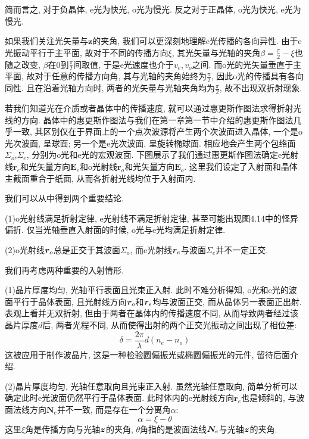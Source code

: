 
简而言之, 对于负晶体, e光为快光, o光为慢光. 反之对于正晶体, o光为快光, e光为慢光.

如果我们关注光矢量与$\bm{z}$的夹角, 我们可以更深刻地理解e光传播的各向异性. 由于e光振动平行于主平面, 故对于不同的传播方向$\xi$, 其光矢量与光轴的夹角$\beta=\frac{\pi}{2}-\xi$也随之改变, $\beta$在$0$到$\frac{\pi}{2}$间取值, 于是e光速度也介于$v_e,v_o$之间. 而o光的光矢量垂直于主平面, 故对于任意的传播方向角, 其与光轴的夹角始终为$\frac{\pi}{2}$, 因此o光的传播具有各向同性. 且在沿着光轴方向时, 两者的光矢量与光轴夹角均为$\frac{\pi}{2}$, 故不出现双折射现象.

若我们知道光在介质或者晶体中的传播速度, 就可以通过惠更斯作图法求得折射光线的方向. 晶体中的惠更斯作图法与我们在第一章第一节中介绍的惠更斯作图法几乎一致, 其区别仅在于界面上的一个点次波源将产生两个次波面进入晶体, 一个是o光次波面, 呈球面; 另一个是e光次波面, 呈旋转椭球面. 相应地会产生两个包络面$\Sigma_o$,$\Sigma_e$, 分别为o光和e光的宏观波面. 下图展示了我们通过惠更斯作图法确定e光射线$\bm{r}_e$和光矢量方向$\bm{E}_e$和o光射线$\bm{r}_o$和光矢量方向$\bm{E}_o$. 这里我们设定了入射面和晶体主截面重合于纸面, 从而各折射光线均位于入射面内.


我们可以从中得到两个重要结论.

(1)o光射线满足折射定律, e光射线不满足折射定律, 甚至可能出现图4.14中的怪异偏折. 仅当光轴垂直入射面的时候, o光与e光均满足折射定律.

(2)o光射线$\bm{r}_o$总是正交于其波面$\Sigma_o$, 而e光射线$\bm{r}_e$与波面$\Sigma_e$并不一定正交.


我们再考虑两种重要的入射情形.

(1)晶片厚度均匀, 光轴平行表面且光束正入射. 此时不难分析得知, o光和e光的波面平行于晶体表面, 且光射线方向$\bm{r}_o$和$\bm{r}_e$均与波面正交, 而从晶体另一表面正出射. 表观上看并无双折射, 但由于两者在晶体内的传播速度不同, 从而导致两者经过该晶片厚度$d$后, 两者光程不同, 从而使得出射的两个正交光振动之间出现了相位差:
\[
\delta = \frac{2\pi}{\lambda}d(n_e-n_o)
\]
这被应用于制作波晶片, 这是一种检验圆偏振光或椭圆偏振光的元件, 留待后面介绍.


(2)晶片厚度均匀, 光轴任意取向且光束正入射. 虽然光轴任意取向, 简单分析可以确定此时e光波面仍然平行于晶体表面. 此时体内的e光射线方向$\bm{r}_e$也是倾斜的, 与波面法线方向$\bm{N}_e$并不一致, 而是存在一个分离角$\alpha$:
\[
\alpha = \xi - \theta
\]
这里$\xi$角是传播方向与光轴$\bm{z}$的夹角, $\theta$角指的是波面法线$\bm{N}_e$与光轴$\bm{z}$的夹角.

